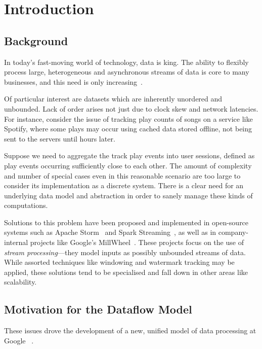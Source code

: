 \chapter{Introduction}\label{ch:intro}

\section{Background}\label{sec:intro:background}

In today's fast-moving world of technology, data is king.
The ability to flexibly process large, heterogeneous and asynchronous streams of data is core to many businesses, and this need is only increasing~\cite{Yin_2015}\cite{mit_bean_variety}.

Of particular interest are datasets which are inherently unordered and unbounded.
Lack of order arises not just due to clock skew and network latencies.
For instance, consider the issue of tracking play counts of songs on a service like Spotify, where some plays may occur using cached data stored offline, not being sent to the servers until hours later.

Suppose we need to aggregate the track play events into user sessions, defined as play events occurring sufficiently close to each other.
The amount of complexity and number of special cases even in this reasonable scenario are too large to consider its implementation as a discrete system.
There is a clear need for an underlying data model and abstraction in order to sanely manage these kinds of computations.

Solutions to this problem have been proposed and implemented in open-source systems such as Apache Storm~\cite{apache_storm} and Spark Streaming~\cite{spark:zaharia2013discretized}, as well as in company-internal projects like Google's MillWheel~\cite{akidau2013millwheel}.
These projects focus on the use of \emph{stream processing}---they model inputs as possibly unbounded streams of data.
While assorted techniques like windowing and watermark tracking may be applied, these solutions tend to be specialised and fall down in other areas like scalability.

\section{Motivation for the Dataflow Model}\label{sec:intro:motivation}

These issues drove the development of a new, unified model of data processing at Google ~\cite{Akidau:2015}.

